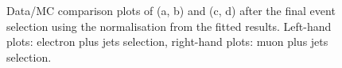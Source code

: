\begin{figure}[!htbp]
    \caption{Data/MC comparison plots of \HT (a, b) and \ST (c, d) after the final event selection using the
    normalisation from the fitted results. Left-hand plots: electron plus jets selection, right-hand plots: muon plus
    jets selection.}
    \label{fig:fitted_HT_ST}
\end{figure}

\begin{figure}[!htbp]
	\centering
  	\hfill
  	 \\
  	\hfill

\end{figure}
